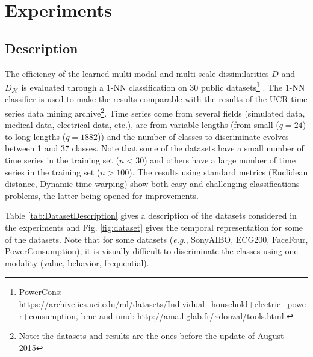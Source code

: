 \chapter{Experiments}
\label{sec:unchapitre}
\minitoc


\section{Description}
The efficiency of the  learned multi-modal and multi-scale dissimilarities $D$ and $D_{\mathcal{H}}$ is evaluated through  a $1$-NN classification on 30 public datasets\footnote{PowerCons:   \url{https://archive.ics.uci.edu/ml/datasets/Individual+household+electric+power+consumption}, {\sc bme} and {\sc umd}:  \url{http://ama.liglab.fr/~douzal/tools.html}.} \cite{Keogh2011}. 
The $1$-NN classifier is used to make the results comparable with the results of the UCR time series data mining archive\footnote{Note: the datasets and results are the ones before the update of August 2015}.
Time series come from several fields (simulated data, medical data, electrical data, etc.), are from variable lengths (from small ($q=24$) to long lengths ($q=1882$)) and the number of classes to discriminate evolves between 1 and 37 classes. Note that some of the datasets have a small number of time series in the training set ($n < 30$) and others have a large number of time series in the training set ($n > 100$). The results using standard metrics (Euclidean distance, Dynamic time warping) show both easy and challenging classifications problems, the latter being opened for improvements. 

Table \ref{tab:DatasetDescription} gives a description of the datasets considered in the experiments and Fig. \ref{fig:dataset} gives the temporal representation for some of the datasets. Note that for some datasets (\textit{e.g.}, SonyAIBO, ECG200, FaceFour, PowerConsumption), it is visually difficult to  discriminate the classes using one modality (value, behavior, frequential).

